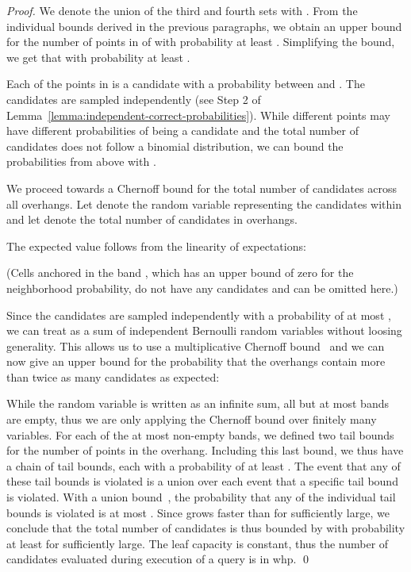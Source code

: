 \documentclass{llncs}
\begin{document}
\begin{proof}
We denote the union of the third and fourth sets with .
From the individual bounds derived in the previous paragraphs, we obtain an upper bound for the number of points in  of  with probability at least .
Simplifying the bound, we get that  with probability at least .

Each of the points in  is a candidate with a probability between  and .
The candidates are sampled independently (see Step 2 of Lemma~\ref{lemma:independent-correct-probabilities}). 
While different points may have different probabilities of being a candidate and the total number of candidates does not follow a binomial distribution,
we can bound the probabilities from above with .

We proceed towards a Chernoff bound for the total number of candidates across all overhangs.
Let  denote the random variable representing the candidates within  and let  denote the total number of candidates in overhangs.

The expected value  follows from the linearity of expectations:


(Cells anchored in the band , which has an upper bound  of zero for the neighborhood probability, do not have any candidates and can be omitted here.)

Since the candidates are sampled independently with a probability of at most , we can treat  as a sum of independent Bernoulli random variables without loosing generality.
This allows us to use a multiplicative Chernoff bound~\cite{mitzenmacher2005probability} and we can now give an upper bound for the probability that the overhangs contain more than twice as many candidates as expected:


While the random variable  is written as an infinite sum, all but at most  bands are empty, thus we are only applying the Chernoff bound over finitely many variables.
For each of the at most  non-empty bands, we defined two tail bounds for the number of points in the overhang. 
Including this last bound, we thus have a chain of  tail bounds, each with a probability of at least .
The event that any of these tail bounds is violated is a union over each event that a specific tail bound is violated.
With a union bound~\cite[Lemma 1.2]{mitzenmacher2005probability}, the probability that any of the individual tail bounds is violated is at most .
Since  grows faster than  for  sufficiently large,
we conclude that the total number of candidates is thus bounded by  with probability at least  for  sufficiently large.
The leaf capacity is constant, thus the number of candidates evaluated during execution of a query  is in  whp.
\qed
\end{proof}
\end{document}
